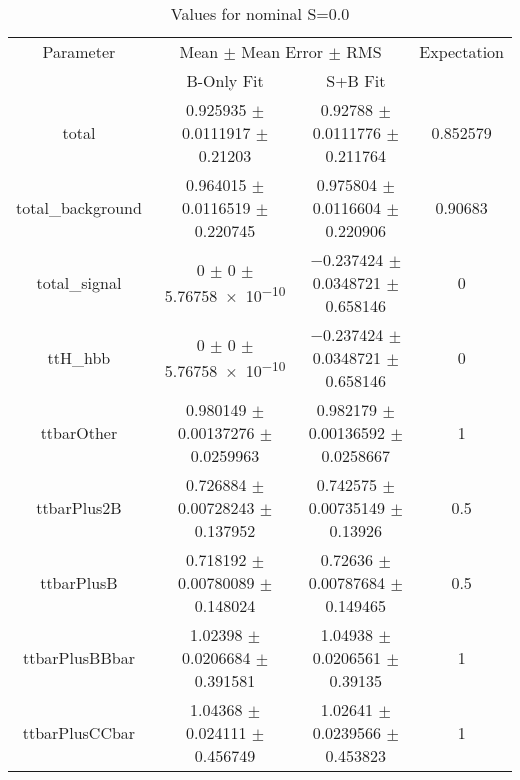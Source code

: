 \begin{table}
\centering
\caption{Values for nominal S=0.0}
\begin{tabular}{cccc}
\toprule
Parameter & \multicolumn{2}{c}{Mean $\pm$ Mean Error $\pm$ RMS} & Expectation\\
 & B-Only Fit & S+B Fit & \\
\midrule
total & \num{0.925935} $\pm$ \num{0.0111917} $\pm$ \num{0.21203} & \num{0.92788} $\pm$ \num{0.0111776} $\pm$ \num{0.211764} & \num{0.852579}\\
total\_background & \num{0.964015} $\pm$ \num{0.0116519} $\pm$ \num{0.220745} & \num{0.975804} $\pm$ \num{0.0116604} $\pm$ \num{0.220906} & \num{0.90683}\\
total\_signal & \num{0} $\pm$ \num{0} $\pm$ \num{5.76758e-10} & \num{-0.237424} $\pm$ \num{0.0348721} $\pm$ \num{0.658146} & \num{0}\\
ttH\_hbb & \num{0} $\pm$ \num{0} $\pm$ \num{5.76758e-10} & \num{-0.237424} $\pm$ \num{0.0348721} $\pm$ \num{0.658146} & \num{0}\\
ttbarOther & \num{0.980149} $\pm$ \num{0.00137276} $\pm$ \num{0.0259963} & \num{0.982179} $\pm$ \num{0.00136592} $\pm$ \num{0.0258667} & \num{1}\\
ttbarPlus2B & \num{0.726884} $\pm$ \num{0.00728243} $\pm$ \num{0.137952} & \num{0.742575} $\pm$ \num{0.00735149} $\pm$ \num{0.13926} & \num{0.5}\\
ttbarPlusB & \num{0.718192} $\pm$ \num{0.00780089} $\pm$ \num{0.148024} & \num{0.72636} $\pm$ \num{0.00787684} $\pm$ \num{0.149465} & \num{0.5}\\
ttbarPlusBBbar & \num{1.02398} $\pm$ \num{0.0206684} $\pm$ \num{0.391581} & \num{1.04938} $\pm$ \num{0.0206561} $\pm$ \num{0.39135} & \num{1}\\
ttbarPlusCCbar & \num{1.04368} $\pm$ \num{0.024111} $\pm$ \num{0.456749} & \num{1.02641} $\pm$ \num{0.0239566} $\pm$ \num{0.453823} & \num{1}\\
\bottomrule
\end{tabular}
\end{table}